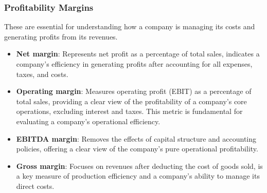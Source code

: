 \documentclass[11pt,english,a4paper,hidelinks]{book}
\begin{document}
\subsubsection{Profitability Margins}
These are essential for understanding how a company is managing its costs and generating profits from its revenues.
\begin{itemize}
    \item \textbf{Net margin}: Represents net profit as a percentage of total sales, indicates a company's efficiency in generating profits after accounting for all expenses, taxes, and costs.
    
    \item \textbf{Operating margin}: Measures operating profit (EBIT) as a percentage of total sales, providing a clear view of the profitability of a company's core operations, excluding interest and taxes. This metric is fundamental for evaluating a company's operational efficiency.
    
    \item \textbf{EBITDA margin}: Removes the effects of capital structure and accounting policies, offering a clear view of the company's pure operational profitability.
    
    \item \textbf{Gross margin}: Focuses on revenues after deducting the cost of goods sold, is a key measure of production efficiency and a company's ability to manage its direct costs.
\end{itemize}
\end{document}

